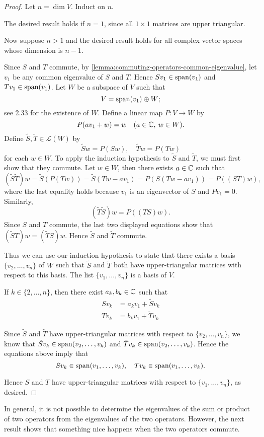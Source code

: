 \begin{proof}
Let $n=\dim V$. Induct on $n$.

The desired result holds if $n=1$, since all $1\times1$ matrices are upper triangular.

Now suppose $n>1$ and the desired result holds for all complex vector spaces whose dimension is $n-1$.

Since $S$ and $T$ commute, by \ref{lemma:commuting-operators-common-eigenvalue}, let $v_1$ be any common eigenvalue of $S$ and $T$. Hence $Sv_1\in\operatorname{span}(v_1)$ and $Tv_1\in\operatorname{span}(v_1)$. Let $W$ be a subspace of $V$ such that
\[V=\operatorname{span}(v_1)\oplus W;\]
see 2.33 for the existence of $W$. Define a linear map $P\colon V\to W$ by
\[P(av_1+w)=w\quad(a\in\mathbb C,\:w\in W).\]
Define $\tilde{S},\tilde{T}\in\mathcal{L}(W)$ by
\[\tilde{S}w=P(Sw),\quad \tilde{T}w=P(Tw)\]
for each $w\in W$. 
To apply the induction hypothesis to $\tilde{S}$ and $\tilde{T}$, we must first show that they commute.
Let $w\in W$, then there exists $a\in\mathbb C$ such that
\[(\tilde{S}\tilde{T})w=\tilde{S}(P(Tw))=\tilde{S}(Tw-av_1)=P(S(Tw-av_1))=P((ST)w),\]
where the last equality holds because $v_1$ is an eigenvector of $S$ and $Pv_1=0$. Similarly,
\[(\tilde{T}\tilde{S})w=P((TS)w).\]
Since $S$ and $T$ commute, the last two displayed equations show that $(\tilde{S}T)w=(\tilde{T}S)w$. Hence $\tilde{S}$ and $\tilde{T}$ commute.

Thus we can use our induction hypothesis to state that there exists a basis $\{v_2,\dots,v_n\}$ of $W$ such that $\tilde{S}$ and $\tilde{T}$ both have upper-triangular matrices with respect to this basis. The list $\{v_1,\dots,v_n\}$ is a basis of $V$.

If $k\in\{2,\dots,n\}$, then there exist $a_k,b_k\in\mathbb C$ such that
\begin{align*}
Sv_k&=a_kv_1+\tilde{S}v_k\\
Tv_k&=b_kv_1+\tilde{T}v_k
\end{align*}

Since $\tilde{S}$ and $\tilde{T}$ have upper-triangular matrices with respect to $\{v_2,\dots,v_n\}$, we know that $\tilde{S}v_k\in\operatorname{span}(v_2,\dots,v_k)$ and $\tilde{T}v_k\in\operatorname{span}(v_2,\dots,v_k)$. Hence the equations above imply that
\[Sv_k\in\operatorname{span}(v_1,\dots,v_k),\quad Tv_k\in\operatorname{span}(v_1,\dots,v_k).\]

Hence $S$ and $T$ have upper-triangular matrices with respect to $\{v_1,\dots,v_n\}$, as desired.
\end{proof}

In general, it is not possible to determine the eigenvalues of the sum or product of two operators from the eigenvalues of the two operators. However, the next result shows that something nice happens when the two operators commute.

